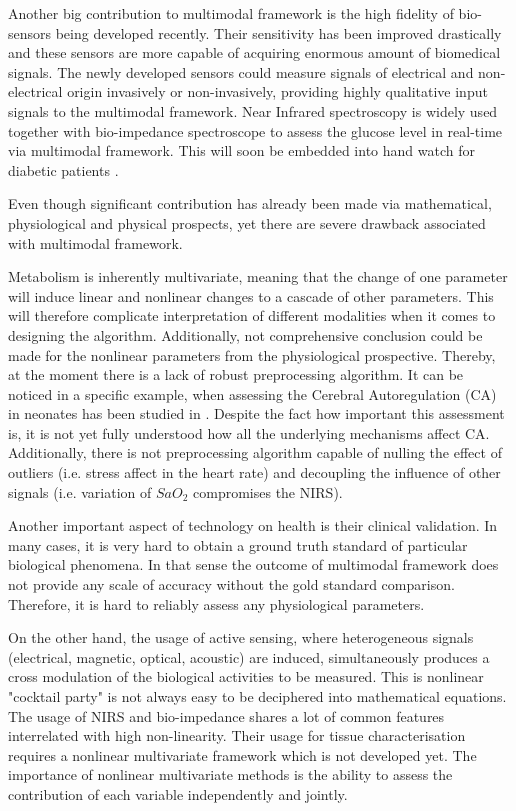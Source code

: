 \documentclass[a4paper]{article}
\begin{document}
Another big contribution to multimodal framework is the high fidelity of bio-sensors being developed recently. Their sensitivity has been improved drastically and these sensors are more capable of acquiring enormous amount of biomedical signals. The newly developed sensors could measure signals of electrical and non-electrical origin invasively or non-invasively, providing highly qualitative input signals to the multimodal framework. Near Infrared spectroscopy is widely used together with bio-impedance spectroscope to assess the glucose level in real-time via multimodal framework. This will soon be embedded into hand watch for diabetic patients \cite{4}.

Even though significant contribution has already been made via mathematical, physiological and physical prospects, yet there are severe drawback associated with multimodal framework.

Metabolism is inherently multivariate, meaning that the change of one parameter will induce linear and nonlinear changes to a cascade of other parameters. This will therefore complicate interpretation of different modalities when it comes to designing the algorithm. Additionally, not comprehensive conclusion could be made for the nonlinear parameters from the physiological prospective. Thereby, at the moment there is a lack of robust preprocessing algorithm. It can be noticed in a specific example, when assessing the Cerebral Autoregulation (CA) in neonates has been studied in \cite{3}. Despite the fact how important this assessment is, it is not yet fully understood how all the underlying mechanisms affect CA. Additionally, there is not preprocessing algorithm capable of nulling the effect of outliers (i.e. stress affect in the heart rate) and decoupling the influence of other signals (i.e. variation of $SaO_{2}$ compromises the NIRS).  


Another important aspect of technology on health is their clinical validation. In many cases, it is very hard to obtain a ground truth standard of particular biological phenomena. In that sense the outcome of multimodal framework does not provide any scale of accuracy without the gold standard comparison. Therefore, it is hard to reliably assess any physiological parameters.

On the other hand, the usage of active sensing, where heterogeneous signals (electrical, magnetic, optical, acoustic) are induced, simultaneously produces a cross modulation of the biological activities to be measured. This is nonlinear "cocktail party" is not always easy to be deciphered into mathematical equations. The usage of NIRS and bio-impedance shares a lot of common features interrelated with high non-linearity. Their usage for tissue characterisation requires a nonlinear multivariate framework which is not developed yet. The importance of nonlinear multivariate methods is the ability to assess the contribution of each variable independently and jointly. 
\end{document}
